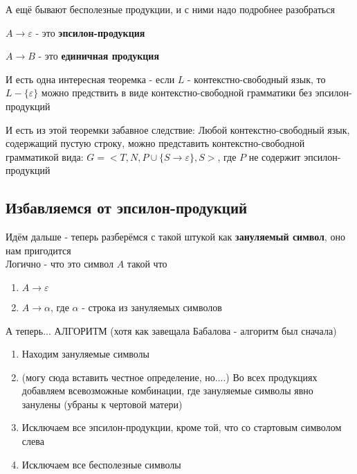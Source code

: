 \documentclass{article}
\begin{document}
А ещё бывают бесполезные продукции, и с ними надо подробнее разобраться

$A \to \varepsilon$ - это \textbf{эпсилон-продукция}

$A \to B$ - это \textbf{единичная продукция}

И есть одна интересная теоремка - если $L$ - контекстно-свободный язык, то $L - \{\varepsilon\}$ можно предствить в виде контекстно-свободной грамматики без эпсилон-продукций 

И есть из этой теоремки забавное следствие: Любой контекстно-свободный язык, содержащий пустую строку, можно представить контекстно-свободной грамматикой вида: 
$ G = <T, N, P \cup \{S\to \varepsilon \}, S>$, где $P$ не содержит эпсилон-продукций

\subsection{Избавляемся от эпсилон-продукций}
Идём дальше - теперь разберёмся с такой штукой как \textbf{зануляемый символ}, оно нам пригодится\\
Логично - что это символ $A$ такой что 
\begin{enumerate}
  \item $A \to \varepsilon$
    \item $A \to \alpha$, где $\alpha$ - строка из зануляемых символов
\end{enumerate}

А теперь... АЛГОРИТМ (хотя как завещала Бабалова - алгоритм был сначала)
\begin{enumerate}
  \item Находим зануляемые символы
    \item (могу сюда вставить честное определение, но....) 
    Во всех продукциях добавляем всевозможные комбинации, где 
    зануляемые символы явно занулены (убраны к чертовой матери)
    \item Исключаем все эпсилон-продукции, кроме той, что со стартовым символом слева
    \item Исключаем все бесполезные символы
\end{enumerate}
\end{document}
